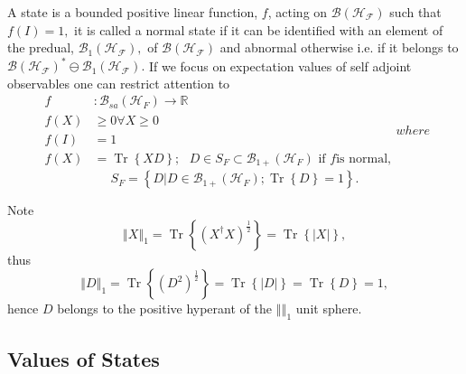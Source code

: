 \documentclass[aps,preprint]{revtex4}%
\begin{document}
A state is a bounded positive linear function, $f$, acting on $\mathcal{B}%
\left(  \mathcal{H}_{\mathcal{F}}\right)  $ such that $f\left(  I\right)  =1,$
it is called a normal state if it can be identified with an element of the
predual, $\mathcal{B}_{1}\left(  \mathcal{H}_{\mathcal{F}}\right)  ,$ of
$\mathcal{B}\left(  \mathcal{H}_{\mathcal{F}}\right)  $ and abnormal otherwise
i.e. if it belongs to $\mathcal{B}\left(  \mathcal{H}_{\mathcal{F}}\right)
^{\ast}\ominus\mathcal{B}_{1}\left(  \mathcal{H}_{\mathcal{F}}\right)  .$ If
we focus on expectation values of self adjoint observables one can restrict
attention to
\begin{subequations}
\label{States}%
\begin{align}
f  &  :\mathcal{B}_{sa}\left(  \mathcal{H}_{F}\right)  \rightarrow
\mathbb{R}\nonumber\\
f\left(  X\right)   &  \geq0\forall X\geq0\nonumber\\
f\left(  I\right)   &  =1\nonumber\\
f\left(  X\right)   &  =\operatorname{Tr}\left\{  XD\right\}  ;\text{ }D\in
S_{F}\subset\mathcal{B}_{1+}\left(  \mathcal{H}_{F}\right)  \text{ if }f\text{
is normal,}%
\end{align}
where
\end{subequations}
\begin{equation}
S_{F}=\left\{  \left.  D\right\vert D\in\mathcal{B}_{1+}\left(  \mathcal{H}%
_{F}\right)  ;\operatorname{Tr}\left\{  D\right\}  =1\right\}  .
\end{equation}


Note
\begin{equation}
\left\Vert X\right\Vert _{1}=\operatorname{Tr}\left\{  \left(  X^{\dagger
}X\right)  ^{\frac{1}{2}}\right\}  =\operatorname{Tr}\left\{  \left\vert
X\right\vert \right\}  ,
\end{equation}
thus
\begin{equation}
\left\Vert D\right\Vert _{1}=\operatorname{Tr}\left\{  \left(  D^{2}\right)
^{\frac{1}{2}}\right\}  =\operatorname{Tr}\left\{  \left\vert D\right\vert
\right\}  =\operatorname{Tr}\left\{  D\right\}  =1,
\end{equation}
hence $D$ belongs to the positive hyperant of the $\left\Vert {}\right\Vert
_{1}$ unit sphere.

\subsection{Values of States}
\end{document}

